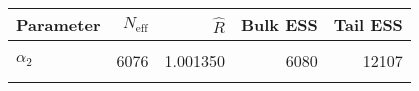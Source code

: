 \begin{table}[!h]
\centering
\begin{tabular}{>{\raggedright\arraybackslash}p{2cm}rrrr}
\toprule
Parameter & $N_{\text{eff}}$ & $\widehat{R}$ & Bulk ESS & Tail ESS\\
\midrule
\cellcolor{gray!6}{$\alpha_{0}$} & \cellcolor{gray!6}{5594} & \cellcolor{gray!6}{1.001154} & \cellcolor{gray!6}{5602} & \cellcolor{gray!6}{10584}\\
$\alpha_{2}$ & 6076 & 1.001350 & 6080 & 12107\\
\cellcolor{gray!6}{$\rho$} & \cellcolor{gray!6}{4737} & \cellcolor{gray!6}{1.000526} & \cellcolor{gray!6}{4767} & \cellcolor{gray!6}{4389}\\
\bottomrule
\end{tabular}
\end{table}
